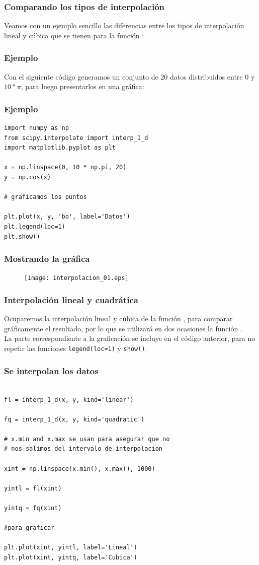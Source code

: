 \begin{frame}
\frametitle{Comparando los tipos de interpolación}
Veamos con un ejemplo sencillo las diferencias entre los tipos de interpolación lineal y cúbica que se tienen para la función :
\end{frame}
\begin{frame}[fragile]
\frametitle{Ejemplo}
Con el siguiente código generamos un conjunto de 20 datos distribuidos entre $0$ y $10 * \pi$, para luego presentarlos en una gráfica:
\end{frame}
\begin{frame}[fragile]
\frametitle{Ejemplo}
\begin{lstlisting}[caption=Generando los puntos, style= FormattedNumber, basicstyle=\linespread{0.9}\ttfamily\small, columns=fullflexible]
import numpy as np
from scipy.interpolate import interp_1_d
import matplotlib.pyplot as plt

x = np.linspace(0, 10 * np.pi, 20)
y = np.cos(x)

# graficamos los puntos

plt.plot(x, y, 'bo', label='Datos')
plt.legend(loc=1)
plt.show()
\end{lstlisting}
\end{frame}
\begin{frame}
\frametitle{Mostrando la gráfica}
\begin{figure}
\hspace*{-0.2cm}\texttt{[image: interpolacion\_01.eps]}
\end{figure}
\end{frame}
\begin{frame}
\frametitle{Interpolación lineal y cuadrática}
Ocuparemos la interpolación lineal y cúbica de la función , para comparar gráficamente el resultado, por lo que se utilizará en dos ocasiones la función .
\\
\bigskip
La parte correspondiente a la graficación se incluye en el código anterior, para no repetir las funciones \texttt{legend(loc=1)} y \texttt{show()}.
\end{frame}
\begin{frame}
\frametitle{Se interpolan los datos}
\begin{lstlisting}[caption=Definiendo el tipo de interpolación, style= FormattedNumber, basicstyle=\linespread{0.9}\ttfamily\small, columns=fullflexible]

fl = interp_1_d(x, y, kind='linear')

fq = interp_1_d(x, y, kind='quadratic')

# x.min and x.max se usan para asegurar que no
# nos salimos del intervalo de interpolacion

xint = np.linspace(x.min(), x.max(), 1000)

yintl = fl(xint)

yintq = fq(xint)

#para graficar

plt.plot(xint, yintl, label='Lineal')
plt.plot(xint, yintq, label='Cubica')
\end{lstlisting}
\end{frame}
